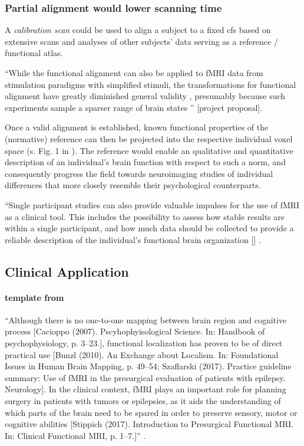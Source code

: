 \subsubsection{Partial alignment would lower scanning time}
%
A \textit{calibration scan} could be used to align a subject to a fixed \ac{cfs}
based on extensive scans and analyses of other subjects' data serving as a
reference / functional atlas.

``While the functional alignment can also be applied to fMRI data from
stimulation paradigms with simplified stimuli, the transformations for
functional alignment have greatly diminished general validity
\citep{haxby2011common}, presumably because such experiments sample a sparser
range of brain states \citep{guntupalli2016model}'' [project proposal].

%
Once a valid alignment is established, known functional properties of the
(normative) reference can then be projected into the respective individual voxel
space (s. Fig. 1 in \citep{nishimoto2016lining}).
%
The reference would enable an qualitative and quantitative description of an
individual's brain function with respect to such a norm, and consequently
progress the field towards neuroimaging studies of individual differences that
more closely resemble their psychological counterparts.

%
``Single participant studies can also provide valuable impulses for the use of
fMRI as a clinical tool.
%
This includes the possibility to assess how stable results are within a single
participant, and how much data should be collected to provide a reliable
description of the individual’s functional brain organization
[\citet{laumann2015functional, gordon2017precision}] \citep{wegrzyn2018thought}.


\subsection{Clinical Application}


\paragraph{template from \citet{wegrzyn2018thought}}

``Although there is no one-to-one mapping between brain region and cognitive
process [Cacioppo (2007). Pscyhophyisological Science. In: Handbook of
psychophysiology, p. 3–23.], functional localization has proven to be of direct
practical use [Bunzl (2010). An Exchange about Localism. In: Foundational Issues
in Human Brain Mapping, p. 49–54; Szaflarski (2017). Practice guideline summary:
Use of fMRI in the presurgical evaluation of patients with epilepsy. Neurology].
%
In the clinical context, fMRI plays an important role for planning surgery in
patients with tumors or epilepsies, as it aids the understanding of which parts
of the brain need to be spared in order to preserve sensory, motor or cognitive
abilities [Stippich (2017). Introduction to Presurgical Functional MRI. In:
Clinical Functional MRI, p. 1–7.]'' \citep{wegrzyn2018thought}.

